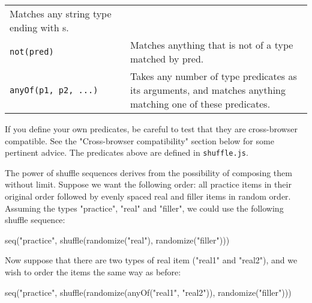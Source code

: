 \documentclass[
]{article}
\newenvironment{Shaded}{}{}
\newcommand{\FunctionTok}[1]{\textcolor[rgb]{0.02,0.16,0.49}{#1}}
\newcommand{\NormalTok}[1]{#1}
\newcommand{\OperatorTok}[1]{\textcolor[rgb]{0.40,0.40,0.40}{#1}}
\newcommand{\StringTok}[1]{\textcolor[rgb]{0.25,0.44,0.63}{#1}}
\begin{document}
\begin{RaggedRight}
\begin{longtable}[]{p{1.7in}p{4.3in}}
\begin{minipage}[t]{0.67\columnwidth}
Matches any string type ending with s.\strut
\end{minipage}\tabularnewline
\begin{minipage}[t]{0.27\columnwidth}\raggedright
\texttt{not(pred)}\strut
\end{minipage} & \begin{minipage}[t]{0.67\columnwidth}\raggedright
Matches anything that is not of a type matched by pred.\strut
\end{minipage}\tabularnewline
\begin{minipage}[t]{0.27\columnwidth}\raggedright
\texttt{anyOf(p1,\ p2,\ ...)}\strut
\end{minipage} & \begin{minipage}[t]{0.67\columnwidth}\raggedright
Takes any number of type predicates as its arguments, and matches
anything matching one of these predicates.\strut
\end{minipage}\tabularnewline
\bottomrule
\end{longtable}\normalsize\end{RaggedRight}

If you define your own predicates, be careful to test that they are
cross-browser compatible. See the "Cross-browser compatibility" section
below for some pertinent advice. The predicates above are defined in
\texttt{shuffle.js}.

The power of shuffle sequences derives from the possibility of composing
them without limit. Suppose we want the following order: all practice
items in their original order followed by evenly spaced real and filler
items in random order. Assuming the types "practice", "real" and
"filler", we could use the following shuffle sequence:

\begin{Shaded}
\begin{Highlighting}[]
    \FunctionTok{seq}\NormalTok{(}\StringTok{"practice"}\OperatorTok{,} \FunctionTok{shuffle}\NormalTok{(}\FunctionTok{randomize}\NormalTok{(}\StringTok{"real"}\NormalTok{)}\OperatorTok{,} \FunctionTok{randomize}\NormalTok{(}\StringTok{"filler"}\NormalTok{)))}
\end{Highlighting}
\end{Shaded}

Now suppose that there are two types of real item ("real1" and "real2"),
and we wish to order the items the same way as before:

\begin{Shaded}
\begin{Highlighting}[]
    \FunctionTok{seq}\NormalTok{(}\StringTok{"practice"}\OperatorTok{,} \FunctionTok{shuffle}\NormalTok{(}\FunctionTok{randomize}\NormalTok{(}\FunctionTok{anyOf}\NormalTok{(}\StringTok{"real1"}\OperatorTok{,} \StringTok{"real2"}\NormalTok{))}\OperatorTok{,}
                    \FunctionTok{randomize}\NormalTok{(}\StringTok{"filler"}\NormalTok{)))}
\end{Highlighting}
\end{Shaded}
\end{document}
